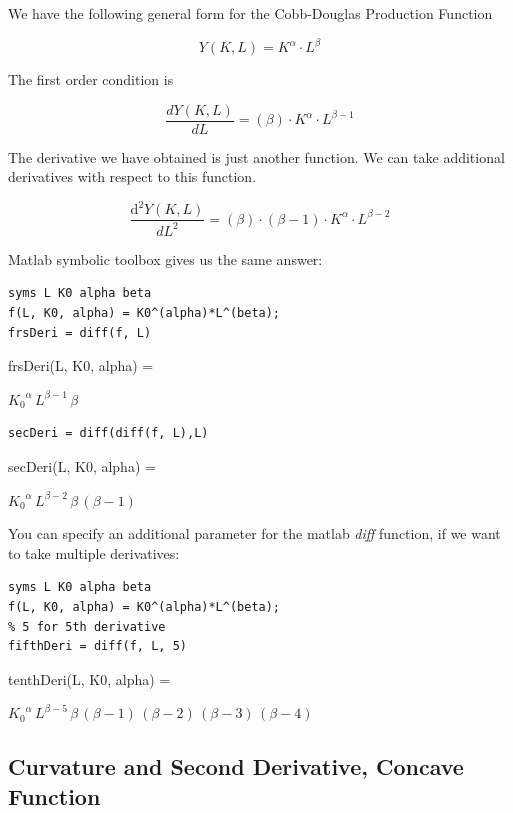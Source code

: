 \documentclass[
]{book}
\begin{document}
We have the following general form for the Cobb-Douglas Production
Function

\[Y(K,L)=K^{\alpha } \cdot L^{\beta }\]

The first order condition is

\[\frac{dY(K,L)}{dL}=(\beta )\cdot K^{\alpha } \cdot L^{\beta -1}\]

The derivative we have obtained is just another function. We can take
additional derivatives with respect to this function.

\[\frac{{\textrm{d}}^2 Y(K,L)}{dL^2 }=(\beta )\cdot (\beta -1)\cdot K^{\alpha } \cdot L^{\beta -2}\]

Matlab symbolic toolbox gives us the same answer:

\begin{verbatim}
syms L K0 alpha beta
f(L, K0, alpha) = K0^(alpha)*L^(beta);
frsDeri = diff(f, L)
\end{verbatim}

frsDeri(L, K0, alpha) =

\(\displaystyle {K_0 }^{\alpha } \,L^{\beta -1} \,\beta\)

\begin{verbatim}
secDeri = diff(diff(f, L),L)
\end{verbatim}

secDeri(L, K0, alpha) =

\(\displaystyle {K_0 }^{\alpha } \,L^{\beta -2} \,\beta \,{\left(\beta -1\right)}\)

You can specify an additional parameter for the matlab \emph{diff} function,
if we want to take multiple derivatives:

\begin{verbatim}
syms L K0 alpha beta
f(L, K0, alpha) = K0^(alpha)*L^(beta);
% 5 for 5th derivative
fifthDeri = diff(f, L, 5)
\end{verbatim}

tenthDeri(L, K0, alpha) =

\(\displaystyle {K_0 }^{\alpha } \,L^{\beta -5} \,\beta \,{\left(\beta -1\right)}\,{\left(\beta -2\right)}\,{\left(\beta -3\right)}\,{\left(\beta -4\right)}\)

\hypertarget{curvature-and-second-derivative-concave-function}{%
\subsection{Curvature and Second Derivative, Concave Function}\label{curvature-and-second-derivative-concave-function}}
\end{document}
